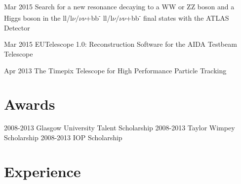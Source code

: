 \documentclass[]{twentysecondcv}
\begin{document}
\begin{twentyshort}
  \twentyitemshort
    {Mar 2015}
    {Search for a new resonance decaying to a WW or ZZ boson and a Higgs boson in the ll/l$\nu/\nu\nu$+bb\textsuperscript{-} ll/l$\nu/\nu\nu$+bb\textsuperscript{-} final states with the ATLAS Detector}
\end{twentyshort}



\begin{twentyshort}
  \twentyitemshort
    {Mar 2015}
    {EUTelescope 1.0: Reconstruction Software
    for the AIDA Testbeam Telescope }
\end{twentyshort}


\begin{twentyshort}
  \twentyitemshort
    {Apr 2013}
    {The Timepix Telescope for High Performance Particle Tracking }
\end{twentyshort}




\section*{Awards}

\begin{twentyshort}
  \twentyitemshort
    {2008-2013}
    {Glasgow University Talent Scholarship }
  \twentyitemshort
    {2008-2013}
    {Taylor Wimpey Scholarship }
  \twentyitemshort
    {2008-2013}
    {IOP Scholarship}
\end{twentyshort}


\section*{Experience}
\end{document}
